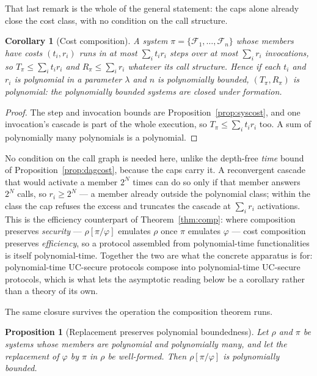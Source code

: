 \documentclass[11pt,a4paper]{article}
\newcommand{\F}{\mathcal{F}}
\theoremstyle{accentdef}
\theoremstyle{accentplain}
\newtheorem{proposition}[definition]{Proposition}
\newtheorem{corollary}[definition]{Corollary}
\begin{document}
That last remark is the whole of the general statement: the caps alone already close the cost
class, with no condition on the call structure.

\begin{corollary}[Cost composition]\label{cor:costcomp}
A system $\pi = \{\F_1,\ldots,\F_n\}$ whose members have costs $(t_i, r_i)$ runs in at most
$\sum_i t_i r_i$ steps over at most $\sum_i r_i$ invocations, so $T_\pi \le \sum_i t_i r_i$ and
$R_\pi \le \sum_i r_i$ whatever its call structure. Hence if each $t_i$ and $r_i$ is polynomial in
a parameter $\lambda$ and $n$ is polynomially bounded, $(T_\pi, R_\pi)$ is polynomial: the
polynomially bounded systems are closed under formation.
\end{corollary}

\begin{proof}
The step and invocation bounds are Proposition~\ref{prop:syscost}, and one invocation's cascade is
part of the whole execution, so $T_\pi \le \sum_i t_i r_i$ too. A sum of polynomially many
polynomials is a polynomial.
\end{proof}

No condition on the call graph is needed here, unlike the depth-free \emph{time} bound of
Proposition~\ref{prop:dagcost}, because the caps carry it. A reconvergent cascade that would
activate a member $2^N$ times can do so only if that member answers $2^N$ calls, so $r_i \ge 2^N$
--- a member already outside the polynomial class; within the class the cap refuses the excess and
truncates the cascade at $\sum_i r_i$ activations. This is the efficiency counterpart of
Theorem~\ref{thm:comp}: where composition preserves \emph{security} --- $\rho[\pi/\varphi]$
emulates $\rho$ once $\pi$ emulates $\varphi$ --- cost composition preserves \emph{efficiency}, so
a protocol assembled from polynomial-time functionalities is itself polynomial-time. Together the
two are what the concrete apparatus is for: polynomial-time UC-secure protocols compose into
polynomial-time UC-secure protocols, which is what lets the asymptotic reading below be a corollary
rather than a theory of its own.

The same closure survives the operation the composition theorem runs.

\begin{proposition}[Replacement preserves polynomial boundedness]\label{prop:replpoly}
Let $\rho$ and $\pi$ be systems whose members are polynomial and polynomially many, and let the
replacement of $\varphi$ by $\pi$ in $\rho$ be well-formed. Then $\rho[\pi/\varphi]$ is
polynomially bounded.
\end{proposition}
\end{document}

